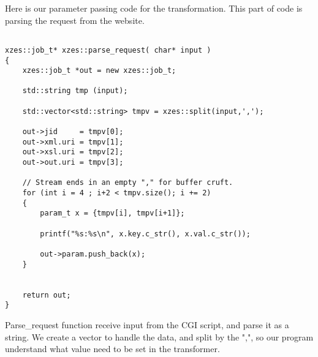 Here is our parameter passing code for the transformation.
This part of code is parsing the request from the website.
\begin{lstlisting}

xzes::job_t* xzes::parse_request( char* input )
{
    xzes::job_t *out = new xzes::job_t;

    std::string tmp (input);

    std::vector<std::string> tmpv = xzes::split(input,',');

    out->jid     = tmpv[0];
    out->xml.uri = tmpv[1];
    out->xsl.uri = tmpv[2];
    out->out.uri = tmpv[3];

    // Stream ends in an empty "," for buffer cruft.
    for (int i = 4 ; i+2 < tmpv.size(); i += 2)
    {
        param_t x = {tmpv[i], tmpv[i+1]};

        printf("%s:%s\n", x.key.c_str(), x.val.c_str());

        out->param.push_back(x);
    }


    return out;
}

\end{lstlisting}

Parse_request function receive input from the CGI script, and parse it as a string.
We create a vector to handle the data, and split by the ",", so our program understand what value need to be set in the transformer.